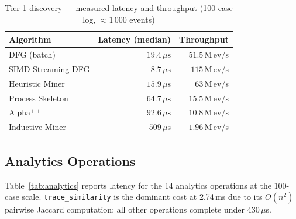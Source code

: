 \documentclass[12pt,a4paper]{article}
\begin{document}
\begin{table}[H]
  \centering
  \caption{Tier 1 discovery --- measured latency and throughput (100-case log, $\approx$1\,000 events)}
  \label{tab:tier1}
  \begin{tabular}{lrr}
    \toprule
    \textbf{Algorithm} & \textbf{Latency (median)} & \textbf{Throughput} \\
    \midrule
    DFG (batch)         & $19.4\,\mu\text{s}$ & $51.5$\,M\,ev/s \\
    SIMD Streaming DFG  & $8.7\,\mu\text{s}$  & $115$\,M\,ev/s \\
    Heuristic Miner     & $15.9\,\mu\text{s}$ & $63$\,M\,ev/s \\
    Process Skeleton    & $64.7\,\mu\text{s}$ & $15.5$\,M\,ev/s \\
    Alpha$^{++}$        & $92.6\,\mu\text{s}$ & $10.8$\,M\,ev/s \\
    Inductive Miner     & $509\,\mu\text{s}$  & $1.96$\,M\,ev/s \\
    \bottomrule
  \end{tabular}
\end{table}

\subsection{Analytics Operations}

Table~\ref{tab:analytics} reports latency for the 14 analytics operations at the
100-case scale. \texttt{trace\_similarity} is the dominant cost at 2.74\,ms due
to its $O(n^2)$ pairwise Jaccard computation; all other operations complete
under 430\,$\mu$s.
\end{document}
